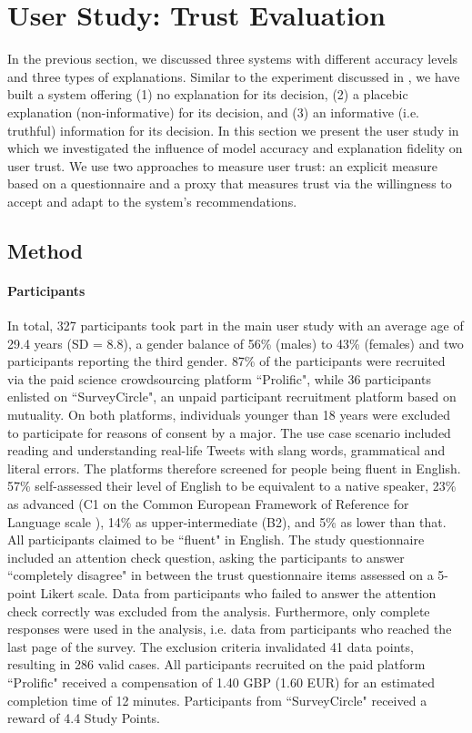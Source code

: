 \section{User Study: Trust Evaluation}
In the previous section, we discussed three systems with different accuracy levels and three types of explanations. Similar to the experiment discussed in \cite{langer1978mindlessness}, we have built a system offering (1) no explanation for its decision, (2) a placebic explanation (non-informative) for its decision, and (3) an informative (i.e. truthful) information for its decision. In this section we present the user study in which we investigated the influence of model accuracy and explanation fidelity on user trust. We use two approaches to measure user trust: an explicit measure based on a questionnaire and a proxy that measures trust via the willingness to accept and adapt to the system's recommendations.


\subsection{Method}

\paragraph{Participants}
In total, 327 participants took part in the main user study with an average age of 29.4 years (SD = 8.8), a gender balance of 56\% (males) to 43\% (females) and two participants reporting the third gender. 87\% of the participants were recruited via the paid science crowdsourcing platform ``Prolific", while 36 participants enlisted on ``SurveyCircle", an unpaid participant recruitment platform based on mutuality.\newline
On both platforms, individuals younger than 18 years were excluded to participate for reasons of consent by a major. The use case scenario included reading and understanding real-life Tweets with slang words, grammatical and literal errors. The platforms therefore screened for people being fluent in English. 57\% self-assessed their level of English to be equivalent to a native speaker, 23\% as advanced (C1 on the Common European Framework of Reference for Language scale \cite{council2001common}), 14\% as upper-intermediate (B2), and 5\% as lower than that. All participants claimed to be ``fluent" in English. The study questionnaire included an attention check question, asking the participants to answer ``completely disagree" in between the trust questionnaire items assessed on a 5-point Likert scale. Data from participants who failed to answer the attention check correctly was excluded from the analysis. Furthermore, only complete responses were used in the analysis, i.e. data from participants who reached the last page of the survey. The exclusion criteria invalidated 41 data points, resulting in 286 valid cases.\newline
All participants recruited on the paid platform ``Prolific" received a compensation of 1.40 GBP (1.60 EUR) for an estimated completion time of 12 minutes. Participants from ``SurveyCircle" received a reward of 4.4 Study Points.\newline


